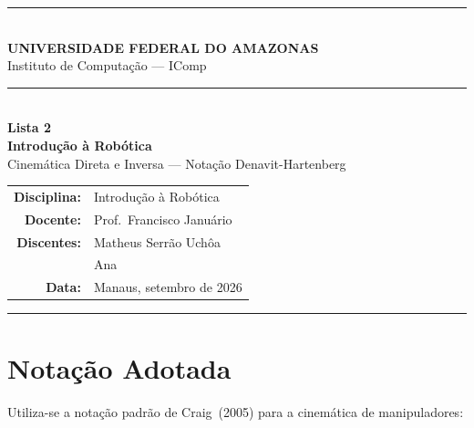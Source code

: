 \documentclass[12pt,a4paper]{article}
\begin{document}
\begin{titlepage}
\centering
\vspace*{0.5cm}

{\color{ufamblue}\rule{\linewidth}{2pt}}\\[0.4cm]
{\Large\bfseries\color{ufamblue} UNIVERSIDADE FEDERAL DO AMAZONAS}\\[0.2cm]
{\large\color{ufamblue} Instituto de Computa\c{c}\~ao --- IComp}\\[0.4cm]
{\color{ufamblue}\rule{\linewidth}{2pt}}\\[2.5cm]

{\LARGE\bfseries Lista 2}\\[0.4cm]
{\Large\bfseries Introdu\c{c}\~ao \`a Rob\'otica}\\[0.3cm]
{\large Cinem\'atica Direta e Inversa --- Nota\c{c}\~ao Denavit-Hartenberg}\\[3cm]

\begin{tabular}{rl}
  \textbf{Disciplina:}  & Introdu\c{c}\~ao \`a Rob\'otica \\[0.3cm]
  \textbf{Docente:}     & Prof.\ Francisco Janu\'ario \\[0.3cm]
  \textbf{Discentes:}   & Matheus Serr\~ao Uch\^oa \\[0.1cm]
                        & Ana \\[0.3cm]
  \textbf{Data:}        & Manaus, setembro de 2026 \\
\end{tabular}

\vfill
{\color{ufamblue}\rule{\linewidth}{1.5pt}}
\end{titlepage}

\newpage
\tableofcontents
\newpage

\section*{Nota\c{c}\~ao Adotada}

Utiliza-se a nota\c{c}\~ao padr\~ao de Craig~(2005) para a cinem\'atica de manipuladores:
\end{document}
